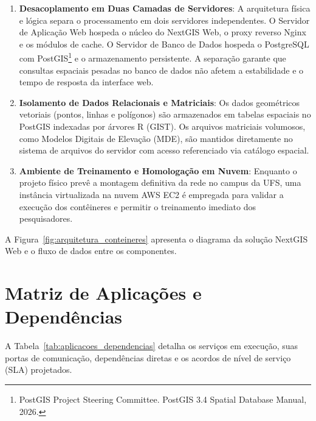 \begin{enumerate}
    \item \textbf{Desacoplamento em Duas Camadas de Servidores}: A arquitetura física e lógica separa o processamento em dois servidores independentes. O Servidor de Aplicação Web hospeda o núcleo do NextGIS Web, o proxy reverso Nginx e os módulos de cache. O Servidor de Banco de Dados hospeda o PostgreSQL com PostGIS\footnote{PostGIS Project Steering Committee. PostGIS 3.4 Spatial Database Manual, 2026.} e o armazenamento persistente. A separação garante que consultas espaciais pesadas no banco de dados não afetem a estabilidade e o tempo de resposta da interface web.
    \item \textbf{Isolamento de Dados Relacionais e Matriciais}: Os dados geométricos vetoriais (pontos, linhas e polígonos) são armazenados em tabelas espaciais no PostGIS indexadas por árvores R (GIST). Os arquivos matriciais volumosos, como Modelos Digitais de Elevação (MDE), são mantidos diretamente no sistema de arquivos do servidor com acesso referenciado via catálogo espacial.
    \item \textbf{Ambiente de Treinamento e Homologação em Nuvem}: Enquanto o projeto físico prevê a montagem definitiva da rede no campus da UFS, uma instância virtualizada na nuvem AWS EC2 é empregada para validar a execução dos contêineres e permitir o treinamento imediato dos pesquisadores.
\end{enumerate}

A Figura~\ref{fig:arquitetura_conteineres} apresenta o diagrama da solução NextGIS Web e o fluxo de dados entre os componentes.


\section{Matriz de Aplicações e Dependências}

A Tabela~\ref{tab:aplicacoes_dependencias} detalha os serviços em execução, suas portas de comunicação, dependências diretas e os acordos de nível de serviço (SLA) projetados.

